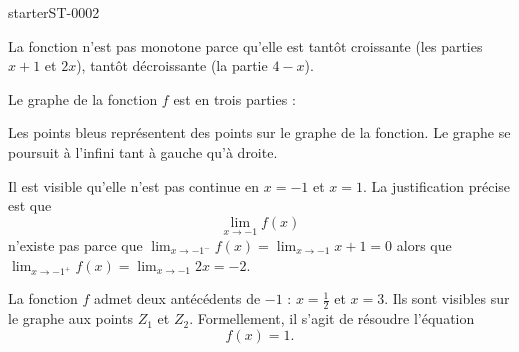 
\begin{corrige}{starterST-0002}

    La fonction n'est pas monotone parce qu'elle est tantôt croissante (les parties \( x+1\) et \( 2x\)), tantôt décroissante (la partie \( 4-x\)).

    Le graphe de la fonction \( f\) est en trois parties :
\begin{center}
   
\end{center}
Les points bleus représentent des points sur le graphe de la fonction. Le graphe se poursuit à l'infini tant à gauche qu'à droite.

Il est visible qu'elle n'est pas continue en \( x=-1\) et \( x=1\). La justification précise est que 
\begin{equation}
    \lim_{x\to -1} f(x)
\end{equation}
n'existe pas parce que \( \lim_{x\to -1^-} f(x)=\lim_{x\to -1} x+1=0\) alors que \( \lim_{x\to -1^+} f(x)=\lim_{x\to -1} 2x=-2\).

La fonction \( f\) admet deux antécédents de \( -1\) : \( x=\frac{ 1 }{2}\) et \( x=3\). Ils sont visibles sur le graphe aux points \( Z_1\) et \( Z_2\). Formellement, il s'agit de résoudre l'équation
\begin{equation}
    f(x)=1.
\end{equation}

\end{corrige}
